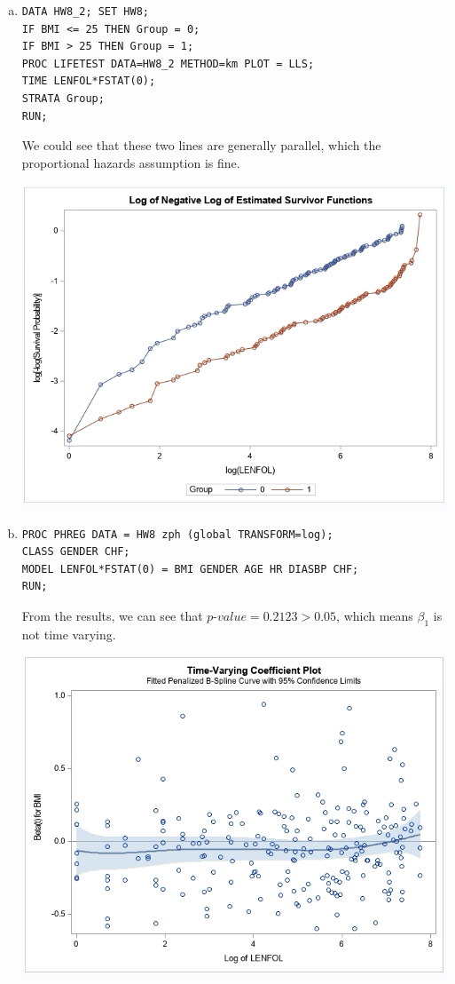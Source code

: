 \documentclass{elegantbook}
\begin{document}
\begin{solution}
\begin{enumerate}
\begin{enumerate}[(a)]
            \item \begin{verbatim}
DATA HW8_2; SET HW8;
IF BMI <= 25 THEN Group = 0;
IF BMI > 25 THEN Group = 1;
PROC LIFETEST DATA=HW8_2 METHOD=km PLOT = LLS;
TIME LENFOL*FSTAT(0);
STRATA Group;
RUN;
            \end{verbatim}
            We could see that these two lines are generally parallel, which the proportional hazards assumption is fine. 
            \begin{center}
                \includegraphics[width=.6\textwidth]{q3a.png}
            \end{center}
            \item \begin{verbatim}
PROC PHREG DATA = HW8 zph (global TRANSFORM=log);
CLASS GENDER CHF; 
MODEL LENFOL*FSTAT(0) = BMI GENDER AGE HR DIASBP CHF;
RUN;
            \end{verbatim}
            From the results, we can see that $p$-$value=0.2123>0.05$, which means $\beta_1$ is not time varying. 
            \begin{center}
                \includegraphics[width=.6\textwidth]{q3b1.png}

\end{center}
\end{enumerate}
\end{enumerate}
\end{solution}
\end{document}
